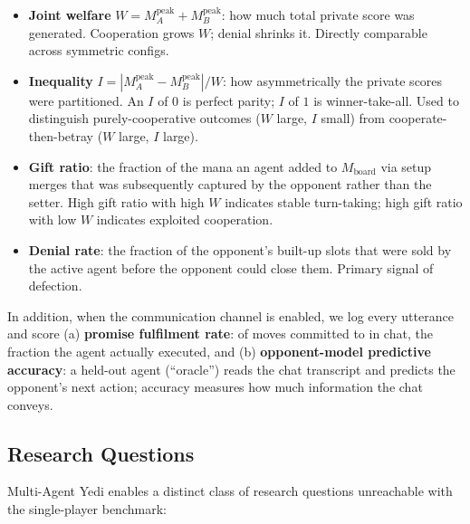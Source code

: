 \documentclass[11pt]{article}
\begin{document}
\begin{itemize}
  \item \textbf{Joint welfare} $W = M_A^{\text{peak}} + M_B^{\text{peak}}$:
    how much total private score was generated. Cooperation grows $W$;
    denial shrinks it. Directly comparable across symmetric configs.
  \item \textbf{Inequality} $I = |M_A^{\text{peak}} - M_B^{\text{peak}}|
    / W$: how asymmetrically the private scores were partitioned. An
    $I$ of $0$ is perfect parity; $I$ of $1$ is winner-take-all. Used to
    distinguish purely-cooperative outcomes ($W$ large, $I$ small) from
    cooperate-then-betray ($W$ large, $I$ large).
  \item \textbf{Gift ratio}: the fraction of the mana an agent added to
    $M_\text{board}$ via setup merges that was subsequently captured by
    the opponent rather than the setter. High gift ratio with high $W$
    indicates stable turn-taking; high gift ratio with low $W$
    indicates exploited cooperation.
  \item \textbf{Denial rate}: the fraction of the opponent's built-up
    slots that were sold by the active agent before the opponent could
    close them. Primary signal of defection.
\end{itemize}

In addition, when the communication channel is enabled, we log every
utterance and score (a) \textbf{promise fulfilment rate}: of moves
committed to in chat, the fraction the agent actually executed, and
(b) \textbf{opponent-model predictive accuracy}: a held-out agent
(``oracle'') reads the chat transcript and predicts the opponent's next
action; accuracy measures how much information the chat conveys.

\subsection{Research Questions}
\label{sec:ma-rqs}

Multi-Agent Yedi enables a distinct class of research questions
unreachable with the single-player benchmark:
\end{document}
